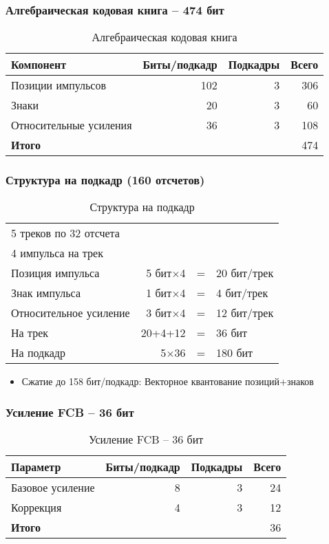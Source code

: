 \documentclass{report}
\begin{document}
	\subsubsection{Алгебраическая кодовая книга -- 474 бит}
	\begin{table}[H]
		\centering
		\caption{Алгебраическая кодовая книга}
		\begin{tabular}{lrrr}
			\toprule
				\textbf{Компонент} & \textbf{Биты/подкадр} & \textbf{Подкадры} & \textbf{Всего} \\
			\midrule
				Позиции импульсов & 102 & 3 & 306 \\
				Знаки & 20 & 3 & 60 \\
				Относительные усиления & 36 & 3 & 108 \\
			\bottomrule
				\textbf{Итого} & & & 474 \\
			\bottomrule
		\end{tabular}
	\end{table}

	\subsubsection{Структура на подкадр (160 отсчетов)}
	\begin{table}[H]
		\centering
		\caption{Структура на подкадр}
		\begin{tabular}{lrcl}
			\toprule
				5 треков по 32 отсчета & & & \\
				4 импульса на трек & & & \\
				Позиция импульса & 5 бит$\times$4 & = & 20 бит/трек \\
				Знак импульса & 1 бит$\times$4 & = & 4 бит/трек \\
				Относительное усиление & 3 бит$\times$4 & = & 12 бит/трек \\
				На трек & 20+4+12 & = & 36 бит \\
				На подкадр & 5$\times$36 & = & 180 бит \\
			\bottomrule
		\end{tabular}
	\end{table}

	\begin{itemize}
		\item Сжатие до 158 бит/подкадр: Векторное квантование позиций+знаков
	\end{itemize}
	
	\subsubsection{Усиление FCB -- 36 бит}
	\begin{table}[H]
		\centering
		\caption{Усиление FCB -- 36 бит}
		\begin{tabular}{lrrr}
			\toprule
			\textbf{Параметр} & \textbf{Биты/подкадр} & \textbf{Подкадры} & \textbf{Всего} \\
			\midrule
			Базовое усиление & 8 & 3 & 24 \\
			Коррекция & 4 & 3 & 12 \\
			\bottomrule
			\textbf{Итого} & & & 36 \\
			\bottomrule
		\end{tabular}
	\end{table}
	
\end{document}
